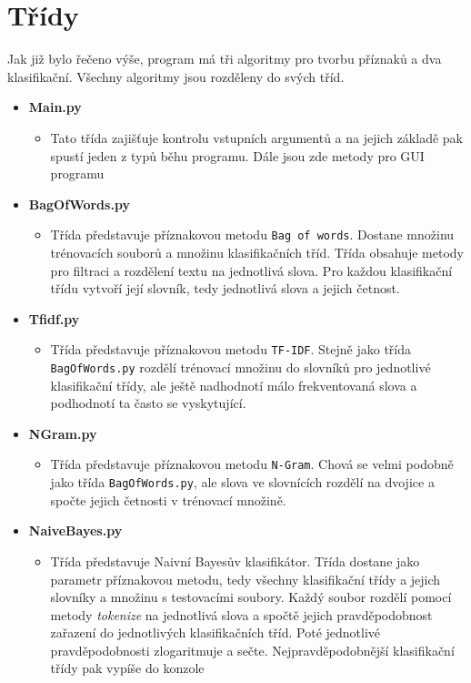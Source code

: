 \documentclass[
12pt,
a4paper,
pdftex,
czech,
titlepage
]{report}
\begin{document}
\section{Třídy}
Jak již bylo řečeno výše, program má tři algoritmy pro tvorbu příznaků a dva klasifikační. Všechny algoritmy jsou rozděleny do svých tříd.
\begin{itemize}
\item{\textbf{Main.py}
\begin{itemize}
\item{Tato třída zajišťuje kontrolu vstupních argumentů a na jejich základě pak spustí jeden z typů běhu programu. Dále jsou zde metody pro GUI programu}
\end{itemize}}
\item{\textbf{BagOfWords.py}
\begin{itemize}
\item{Třída představuje příznakovou metodu \texttt{Bag of words}. Dostane množinu trénovacích souborů a množinu klasifikačních tříd. Třída obsahuje metody pro filtraci a rozdělení textu na jednotlivá slova.  Pro každou klasifikační třídu vytvoří její slovník, tedy jednotlivá slova a jejich četnost.}
\end{itemize}}
\item{\textbf{Tfidf.py}
\begin{itemize}
\item{Třída představuje příznakovou metodu \texttt{TF-IDF}. Stejně jako třída \texttt{BagOfWords.py} rozdělí trénovací množinu do slovníků pro jednotlivé klasifikační třídy, ale ještě nadhodnotí málo frekventovaná slova a podhodnotí ta často se vyskytující.}
\end{itemize}}
\item{\textbf{NGram.py}
\begin{itemize}
\item{Třída představuje příznakovou metodu \texttt{N-Gram}. Chová se velmi podobně jako třída \texttt{BagOfWords.py}, ale slova ve slovnících rozdělí na dvojice a spočte jejich četnosti v trénovací množině.}
\end{itemize}}
\item{\textbf{NaiveBayes.py}
\begin{itemize}
\item{Třída představuje Naivní Bayesův klasifikátor. Třída dostane jako parametr příznakovou metodu, tedy všechny klasifikační třídy a jejich slovníky a množinu s testovacími soubory. Každý soubor rozdělí pomocí metody \textit{tokenize} na jednotlivá slova a spočtě jejich pravděpodobnost zařazení do jednotlivých klasifikačních tříd. Poté jednotlivé pravděpodobnosti zlogaritmuje a sečte. Nejpravděpodobnější klasifikační třídy pak vypíše do konzole}

\end{itemize}}
\end{itemize}
\end{document}
